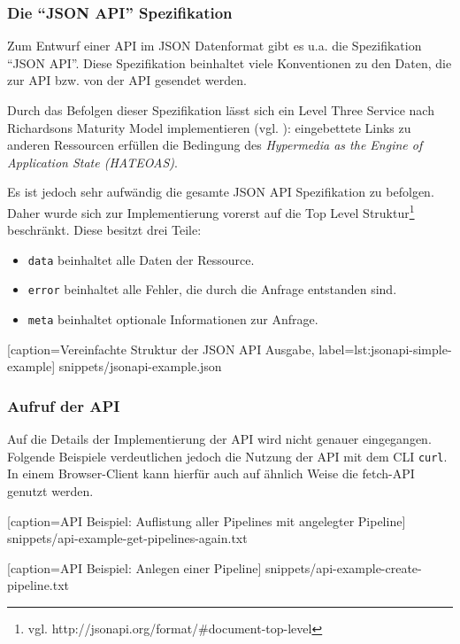 \subsubsection{Die ``JSON API'' Spezifikation}
\label{subsec:jsonapi}

Zum Entwurf einer API im JSON Datenformat gibt es u.a. die Spezifikation ``JSON API''. Diese Spezifikation beinhaltet viele Konventionen zu den Daten, die zur API bzw. von der API gesendet werden.

Durch das Befolgen dieser Spezifikation lässt sich ein Level Three Service nach Richardsons Maturity Model implementieren (vgl. \citep[20]{Webber2010}): eingebettete Links zu anderen Ressourcen erfüllen die Bedingung des \emph{Hypermedia as the Engine of Application State (HATEOAS)}.

Es ist jedoch sehr aufwändig die gesamte JSON API Spezifikation zu befolgen. Daher wurde sich zur Implementierung vorerst auf die Top Level Struktur\footnote{vgl. http://jsonapi.org/format/\#document-top-level} beschränkt. Diese besitzt drei Teile:

\begin{itemize}
  \item \texttt{data} beinhaltet alle Daten der Ressource.
  \item \texttt{error} beinhaltet alle Fehler, die durch die Anfrage entstanden sind.
  \item \texttt{meta} beinhaltet optionale Informationen zur Anfrage.
\end{itemize}


  [caption={Vereinfachte Struktur der JSON API Ausgabe},
  label={lst:jsonapi-simple-example}]
  {snippets/jsonapi-example.json}

\subsubsection{Aufruf der API}

Auf die Details der Implementierung der API wird nicht genauer eingegangen. Folgende Beispiele verdeutlichen jedoch die Nutzung der API mit dem \ac{CLI} \texttt{curl}. In einem Browser-Client kann hierfür auch auf ähnlich Weise die fetch-API genutzt werden.


  [caption={API Beispiel: Auflistung aller Pipelines mit angelegter Pipeline}]
  {snippets/api-example-get-pipelines-again.txt}


  [caption={API Beispiel: Anlegen einer Pipeline}]
  {snippets/api-example-create-pipeline.txt}

